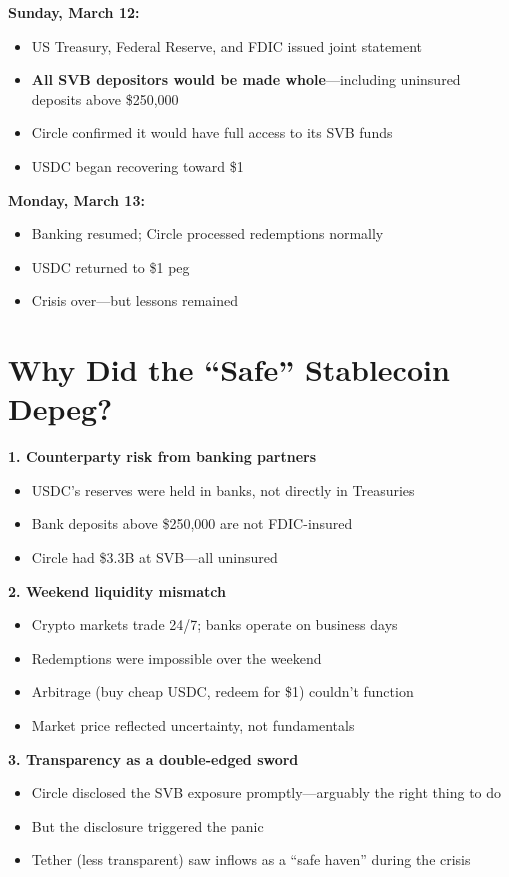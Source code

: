\documentclass[11pt]{article}
\begin{document}
\medskip
\noindent\textbf{Sunday, March 12:}
\begin{itemize}[leftmargin=*]
\item US Treasury, Federal Reserve, and FDIC issued joint statement
\item \textbf{All SVB depositors would be made whole}---including uninsured deposits above \$250,000
\item Circle confirmed it would have full access to its SVB funds
\item USDC began recovering toward \$1
\end{itemize}

\medskip
\noindent\textbf{Monday, March 13:}
\begin{itemize}[leftmargin=*]
\item Banking resumed; Circle processed redemptions normally
\item USDC returned to \$1 peg
\item Crisis over---but lessons remained
\end{itemize}

\section*{Why Did the ``Safe'' Stablecoin Depeg?}

\textbf{1. Counterparty risk from banking partners}
\begin{itemize}[leftmargin=*]
\item USDC's reserves were held in banks, not directly in Treasuries
\item Bank deposits above \$250,000 are not FDIC-insured
\item Circle had \$3.3B at SVB---all uninsured
\end{itemize}

\medskip
\noindent\textbf{2. Weekend liquidity mismatch}
\begin{itemize}[leftmargin=*]
\item Crypto markets trade 24/7; banks operate on business days
\item Redemptions were impossible over the weekend
\item Arbitrage (buy cheap USDC, redeem for \$1) couldn't function
\item Market price reflected uncertainty, not fundamentals
\end{itemize}

\medskip
\noindent\textbf{3. Transparency as a double-edged sword}
\begin{itemize}[leftmargin=*]
\item Circle disclosed the SVB exposure promptly---arguably the right thing to do
\item But the disclosure triggered the panic
\item Tether (less transparent) saw inflows as a ``safe haven'' during the crisis
\end{itemize}
\end{document}

